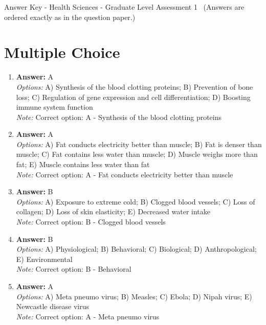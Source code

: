 \documentclass[12pt]{article}
\begin{document}
\begin{center}
Answer Key - Health Sciences - Graduate Level Assessment 1 \
\small (Answers are ordered exactly as in the question paper.)
\end{center}

\section*{Multiple Choice}
\begin{enumerate}[label=\arabic*.]
\item \textbf{Answer:} A
\\ \textit{Options:} A) Synthesis of the blood clotting proteins; B) Prevention of bone loss; C) Regulation of gene expression and cell differentiation; D) Boosting immune system function
\\ \textit{Note:} Correct option: A - Synthesis of the blood clotting proteins
\item \textbf{Answer:} A
\\ \textit{Options:} A) Fat conducts electricity better than muscle; B) Fat is denser than muscle; C) Fat contains less water than muscle; D) Muscle weighs more than fat; E) Muscle contains less water than fat
\\ \textit{Note:} Correct option: A - Fat conducts electricity better than muscle
\item \textbf{Answer:} B
\\ \textit{Options:} A) Exposure to extreme cold; B) Clogged blood vessels; C) Loss of collagen; D) Loss of skin elasticity; E) Decreased water intake
\\ \textit{Note:} Correct option: B - Clogged blood vessels
\item \textbf{Answer:} B
\\ \textit{Options:} A) Physiological; B) Behavioral; C) Biological; D) Anthropological; E) Environmental
\\ \textit{Note:} Correct option: B - Behavioral
\item \textbf{Answer:} A
\\ \textit{Options:} A) Meta pneumo virus; B) Measles; C) Ebola; D) Nipah virus; E) Newcastle disease virus
\\ \textit{Note:} Correct option: A - Meta pneumo virus
\end{enumerate}
\end{document}
